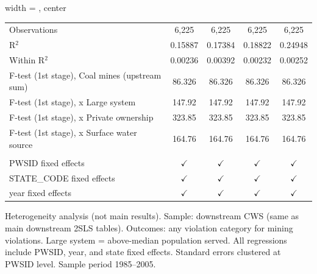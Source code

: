 \begin{table}[htbp]
\begin{adjustbox}{width = \textwidth, center}
\begin{tabular}{lcccc}
          \\
         
         Observations                                  & 6,225         & 6,225         & 6,225               & 6,225\\  
         R$^2$                                         & 0.15887       & 0.17384       & 0.18822             & 0.24948\\  
         Within R$^2$                                  & 0.00236       & 0.00392       & 0.00232             & 0.00252\\  
         F-test (1st stage), Coal mines (upstream sum) & 86.326        & 86.326        & 86.326              & 86.326\\  
         F-test (1st stage),   x Large system          & 147.92        & 147.92        & 147.92              & 147.92\\  
         F-test (1st stage),   x Private ownership     & 323.85        & 323.85        & 323.85              & 323.85\\  
         F-test (1st stage),   x Surface water source  & 164.76        & 164.76        & 164.76              & 164.76\\  
         
          \\
         
         PWSID fixed effects                           & $\checkmark$  & $\checkmark$  & $\checkmark$        & $\checkmark$\\   
         STATE\_CODE fixed effects                     & $\checkmark$  & $\checkmark$  & $\checkmark$        & $\checkmark$\\   
         year fixed effects                            & $\checkmark$  & $\checkmark$  & $\checkmark$        & $\checkmark$\\   
         
         \bottomrule
         
      \end{tabular}
      
      
      
   \end{adjustbox}
      {\tiny\linespread{1}\selectfont \par \raggedright 
   Heterogeneity analysis (not main results). Sample: downstream CWS (same as main downstream 2SLS tables). Outcomes: any violation category for mining violations. Large system = above-median population served. All regressions include PWSID, year, and state fixed effects. Standard errors clustered at PWSID level. Sample period 1985--2005.}
   
\end{table}


